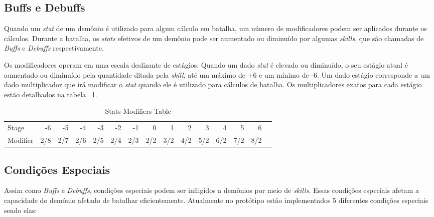 \subsection{Buffs e Debuffs}

	Quando um \emph{stat} de um demônio é utilizado para algum cálculo em batalha, um número de modificadores podem ser aplicados durante os cálculos. Durante a batalha, os \emph{stats} efetivos de um demônio pode ser aumentado ou diminuído por algumas \emph{skills}, que são chamadas de \emph{Buffs} e \emph{Debuffs} respectivamente.
	
	Os modificadores operam em uma escala deslizante de estágios. Quando um dado \emph{stat} é elevado ou diminuído, o seu estágio atual é aumentado ou diminuído pela quantidade ditada pela \emph{skill}, até um máximo de +6 e um mínimo de -6. Um dado estágio corresponde a um dado multiplicador que irá modificar o \emph{stat} quando ele é utilizado para cálculos de batalha. Os multiplicadores exatos para cada estágio estão detalhados na tabela ~\ref{tab:stages}.
	
\begin{table}[!htp]\centering
\caption{Stats Modifiers Table}\label{tab:stages}
\scriptsize
\begin{tabular}{lrrrrrrrrrrrrrr}\toprule
Stage &-6 &-5 &-4 &-3 &-2 &-1 &0 &1 &2 &3 &4 &5 &6 \\\cmidrule{1-14}
Modifier &2/8 &2/7 &2/6 &2/5 &2/4 &2/3 &2/2 &3/2 &4/2 &5/2 &6/2 &7/2 &8/2 \\\midrule
\bottomrule
\end{tabular}
\end{table}

\subsection{Condições Especiais}\label{conditions}

	Assim como \emph{Buffs} e \emph{Debuffs}, condições especiais podem ser infligidos a demônios por meio de \emph{skills}. Essas condições especiais afetam a capacidade do demônio afetado de batalhar eficientemente. Atualmente no protótipo estão implementados 5 diferentes condições especiais sendo elas:

